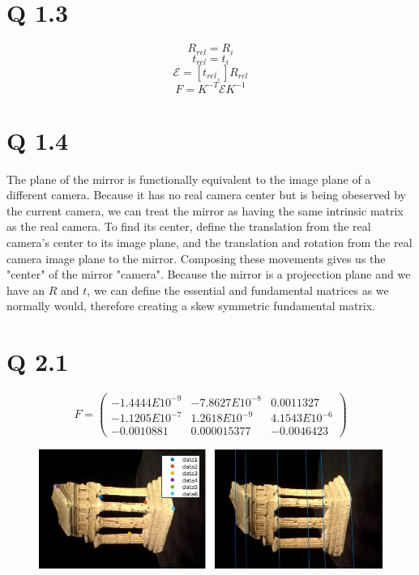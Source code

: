 \documentclass[11pt]{article}
\begin{document}
\section*{Q 1.3}
$$R_{rel}=R_i$$
$$t_{rel}=t_i$$
$$\mathcal{E}=[t_{rel_\times}]R_{rel}$$
$$F=K^{-T}\mathcal{E}K^{-1}$$
\section*{Q 1.4}
The plane of the mirror is functionally equivalent to the image plane of a different camera. Because it has
no real camera center but is being obeserved by the current camera, we can treat the mirror as having the same
intrinsic matrix as the real camera. To find its center, define the translation from the real camera's
center to its image plane, and the translation and rotation from the real camera image plane to the mirror. Composing 
these movements gives us the "center" of the mirror "camera". Because the mirror is a projecction plane
and we have an $R$ and $t$, we can define the essential and fundamental matrices as we normally would, 
therefore creating a skew symmetric fundamental matrix.

\section*{Q 2.1}
    $$F=\left(\begin{array}{ccc} -1.4444E{10}^{-9} & -7.8627E{10}^{-8} & 0.0011327\\ -1.1205E{10}^{-7} &
1.2618E{10}^{-9} & 4.1543E{10}^{-6}\\ -0.0010881 & 0.000015377 & -0.0046423 \end{array}\right)$$
\begin{figure}[H]
    \centering
    \includegraphics[width=\textwidth]{q2_1.jpg}
\end{figure}
\end{document}
